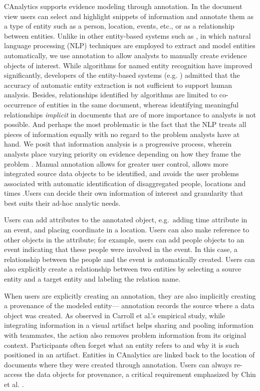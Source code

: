 \documentclass[]{article}
\begin{document}
CAnalytics supports evidence modeling through annotation. In the
document view users can select and highlight snippets of information and
annotate them as a type of entity such as a person, location, events,
etc., or as a relationship between entities. Unlike in other
entity-based systems such as \autocites{Bier2010}{Stasko2008}, in which
natural language processing (NLP) techniques are employed to extract and
model entities automatically, we use annotation to allow analysts to
manually create evidence objects of interest. While algorithms for named
entity recognition have improved significantly, developers of the
entity-based systems (e.g. \autocite{Gorg2014}) admitted that the
accuracy of automatic entity extraction is not sufficient to support
human analysis. Besides, relationships identified by algorithms are
limited to co-occurrence of entities in the same document, whereas
identifying meaningful relationships \emph{implicit} in documents that
are of more importance to analysts is not possible. And perhaps the most
problematic is the fact that the NLP treats all pieces of information
equally with no regard to the problem analysts have at hand. We posit
that information analysis is a progressive process, wherein analysts
place varying priority on evidence depending on how they frame the
problem \autocite{Heuer1999}. Manual annotation allows for greater user
control, allows more integrated source data objects to be identified,
and avoids the user problems associated with automatic identification of
disaggregated people, locations and times \autocite{Bier2008}.Users can
decide their own information of interest and granularity that best suits
their ad-hoc analytic needs.

Users can add attributes to the annotated object, e.g.~adding time
attribute in an event, and placing coordinate in a location. Users can
also make reference to other objects in the attribute; for example,
users can add people objects to an event indicating that these people
were involved in the event. In this case, a relationship between the
people and the event is automatically created. Users can also explicitly
create a relationship between two entities by selecting a source entity
and a target entity and labeling the relation name.

When users are explicitly creating an annotation, they are also
implicitly creating a provenance of the modeled entity--- annotation
records the source where a data object was created. As observed in
Carroll et al.'s \autocite{Carroll2013} empirical study, while
integrating information in a visual artifact helps sharing and pooling
information with teammates, the action also removes problem information
from its original context. Participants often forget what an entity
refers to and why it is such positioned in an artifact. Entities in
CAnalytics are linked back to the location of documents where they were
created through annotation. Users can always re-access the data objects
for provenance, a critical requirement emphasized by Chin et al.
\autocite{Chin2009}.
\end{document}
